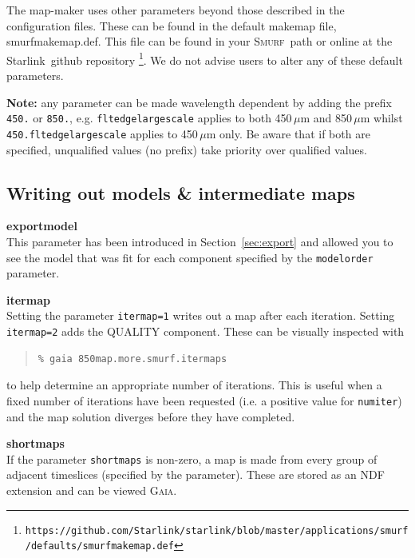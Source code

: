 \documentclass[twoside,11pt]{article}
\newcommand{\htmladdnormallink}[2]{#1}
\newcommand{\htmlref}[2]{#1}
\newcommand{\latex}[1]{#1}
\newcommand{\latexhtml}[2]{#1}
\newcommand{\xref}[3]{#1}
\newcommand{\xlabel}[1]{}
\renewcommand{\_}{\texttt{\symbol{95}}}
\newenvironment{myquote}{\begin{quote}\begin{small}}{\end{small}\end{quote}}
\newcommand{\starlink}{\htmladdnormallink{Starlink}{http://starlink.jach.hawaii.edu}}
\newcommand{\gaia}{\xref{\textsc{Gaia}}{sun214}{}}
\newcommand{\smurf}{\xref{\textsc{Smurf}}{sun258}{}}
\newcommand{\cref}[3]{\latexhtml{#1~\ref{#2}}{\htmlref{#3}{#2}}}
\begin{document}
The map-maker uses other parameters beyond those described in the
configuration files. These can be found in the default makemap file,
smurf\_makemap.def. This file can be found in your \smurf\ path or
online at the \starlink\
\htmladdnormallink{github
repository}{https://github.com/Starlink/starlink/blob/master/applications/smurf/defaults/smurf\_makemap.def}
\latex{\footnote{\texttt{https://github.com/Starlink/starlink/blob/master/applications/smurf/defaults/smurf\_makemap.def}}}.
We do not advise users to alter any of these default parameters.

\textbf{Note:} any parameter can be made wavelength dependent by
adding the prefix \texttt{450.} or \texttt{850.}, e.g.
\texttt{flt\_edge\_largescale} applies to both 450\,$\mu$m and
850\,$\mu$m whilst \texttt{450.flt\_edge\_largescale} applies to
450\,$\mu$m only. Be aware that if both are specified, unqualified
values (no prefix) take priority over qualified values.

\subsection{\xlabel{inter}Writing out models \& intermediate maps}
\textbf{exportmodel}\\
This parameter has been introduced in
\cref{Section}{sec:export}{Exporting individual models} and
allowed you to see the model that was fit for each component
specified by the \texttt{modelorder} parameter.

{\bf itermap}\\
Setting the parameter \texttt{itermap=1} writes out a map after each
iteration. Setting \texttt{itermap=2} adds the QUALITY component.
These can be visually inspected with

\begin{myquote}
\begin{verbatim}
% gaia 850map.more.smurf.itermaps
\end{verbatim}
\end{myquote}
to help determine an appropriate number of iterations. This is useful
when a fixed number of iterations have been requested (i.e. a positive
value for \texttt{numiter}) and the map solution diverges before
they have completed.

\textbf{shortmaps}\\
If the parameter \texttt{shortmaps} is non-zero, a map is made from
every group of adjacent timeslices (specified by the parameter).
These are stored as an NDF extension and can be viewed \gaia.
\end{document}
